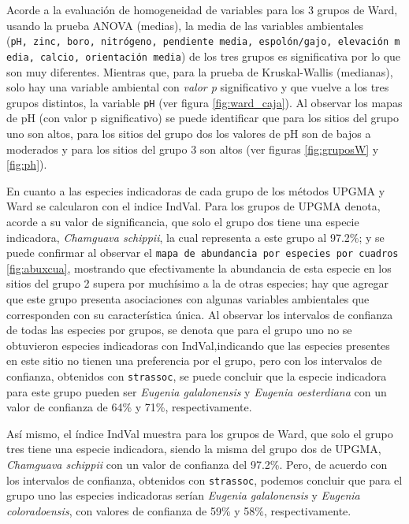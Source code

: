 \documentclass[11pt,]{article}
\begin{document}
Acorde a la evaluación de homogeneidad de variables para los 3 grupos de
Ward, usando la prueba ANOVA (medias), la media de las variables
ambientales
(\texttt{pH,\ zinc,\ boro,\ nitrógeno,\ pendiente\ media,\ espolón/gajo,\ elevación\ media,\ calcio,\ orientación\ media})
de los tres grupos es significativa por lo que son muy diferentes.
Mientras que, para la prueba de Kruskal-Wallis (medianas), solo hay una
variable ambiental con \emph{valor p} significativo y que vuelve a los
tres grupos distintos, la variable \texttt{pH} (ver figura
\ref{fig:ward_caja}). Al observar los mapas de pH (con valor p
significativo) se puede identificar que para los sitios del grupo uno
son altos, para los sitios del grupo dos los valores de pH son de bajos
a moderados y para los sitios del grupo 3 son altos (ver figuras
\ref{fig:gruposW} y \ref{fig:ph}).

En cuanto a las especies indicadoras de cada grupo de los métodos UPGMA
y Ward se calcularon con el indice IndVal. Para los grupos de UPGMA
denota, acorde a su valor de significancia, que solo el grupo dos tiene
una especie indicadora, \emph{Chamguava schippii}, la cual representa a
este grupo al 97.2\%; y se puede confirmar al observar el
\texttt{mapa\ de\ abundancia\ por\ especies\ por\ cuadros}
\ref{fig:abuxcua}, mostrando que efectivamente la abundancia de esta
especie en los sitios del grupo 2 supera por muchísimo a la de otras
especies; hay que agregar que este grupo presenta asociaciones con
algunas variables ambientales que corresponden con su característica
única. Al observar los intervalos de confianza de todas las especies por
grupos, se denota que para el grupo uno no se obtuvieron especies
indicadoras con IndVal,indicando que las especies presentes en este
sitio no tienen una preferencia por el grupo, pero con los intervalos de
confianza, obtenidos con \texttt{strassoc}, se puede concluir que la
especie indicadora para este grupo pueden ser \emph{Eugenia
galalonensis} y \emph{Eugenia oesterdiana} con un valor de confianza de
64\% y 71\%, respectivamente.

Así mismo, el índice IndVal muestra para los grupos de Ward, que solo el
grupo tres tiene una especie indicadora, siendo la misma del grupo dos
de UPGMA, \emph{Chamguava schippii} con un valor de confianza del
97.2\%. Pero, de acuerdo con los intervalos de confianza, obtenidos con
\texttt{strassoc}, podemos concluir que para el grupo uno las especies
indicadoras serían \emph{Eugenia galalonensis} y \emph{Eugenia
coloradoensis}, con valores de confianza de 59\% y 58\%,
respectivamente.
\end{document}
